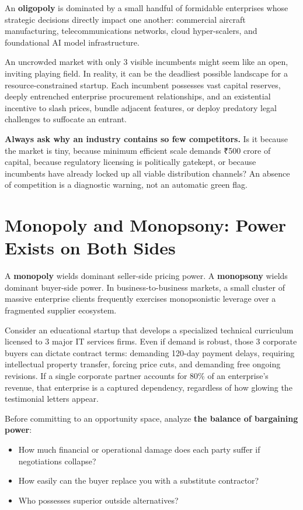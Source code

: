An \textbf{oligopoly} is dominated by a small handful of formidable enterprises whose strategic decisions directly impact one another: commercial aircraft manufacturing, telecommunications networks, cloud hyper-scalers, and foundational AI model infrastructure.

An uncrowded market with only 3 visible incumbents might seem like an open, inviting playing field. In reality, it can be the deadliest possible landscape for a resource-constrained startup. Each incumbent possesses vast capital reserves, deeply entrenched enterprise procurement relationships, and an existential incentive to slash prices, bundle adjacent features, or deploy predatory legal challenges to suffocate an entrant.

\textbf{Always ask why an industry contains so few competitors.} Is it because the market is tiny, because minimum efficient scale demands ₹500 crore of capital, because regulatory licensing is politically gatekept, or because incumbents have already locked up all viable distribution channels? An absence of competition is a diagnostic warning, not an automatic green flag.

\section{Monopoly and Monopsony: Power Exists on Both Sides}

A \textbf{monopoly} wields dominant seller-side pricing power. A \textbf{monopsony} wields dominant buyer-side power. In business-to-business markets, a small cluster of massive enterprise clients frequently exercises monopsonistic leverage over a fragmented supplier ecosystem.

Consider an educational startup that develops a specialized technical curriculum licensed to 3 major IT services firms. Even if demand is robust, those 3 corporate buyers can dictate contract terms: demanding 120-day payment delays, requiring intellectual property transfer, forcing price cuts, and demanding free ongoing revisions. If a single corporate partner accounts for 80\% of an enterprise's revenue, that enterprise is a captured dependency, regardless of how glowing the testimonial letters appear.

Before committing to an opportunity space, analyze \textbf{the balance of bargaining power}:
\begin{itemize}[leftmargin=12pt,itemsep=1pt,topsep=1pt]
  \item How much financial or operational damage does each party suffer if negotiations collapse?
  \item How easily can the buyer replace you with a substitute contractor?
  \item Who possesses superior outside alternatives?
\end{itemize}

